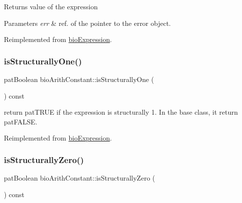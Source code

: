 \begin{DoxyReturn}{Returns}
value of the expression 
\end{DoxyReturn}

\begin{DoxyParams}{Parameters}
{\em err} & ref. of the pointer to the error object. \\
\hline
\end{DoxyParams}


Reimplemented from \hyperlink{classbio_expression_af58662a5d4d456f15bc4f2c9bd4f8a5b}{bio\+Expression}.

\mbox{\label{classbio_arith_constant_a979ab2441d612a23a708fa3c10f3dd6a}} 
\subsubsection{\texorpdfstring{is\+Structurally\+One()}{isStructurallyOne()}}
{\footnotesize\ttfamily pat\+Boolean bio\+Arith\+Constant\+::is\+Structurally\+One (\begin{DoxyParamCaption}{ }\end{DoxyParamCaption}) const\hspace{0.3cm}{\ttfamily [virtual]}}

return pat\+T\+R\+UE if the expression is structurally 1. In the base class, it return pat\+F\+A\+L\+SE. 

Reimplemented from \hyperlink{classbio_expression_a754b37dd7a3e0bb943c23ed8ebd48eaa}{bio\+Expression}.

\mbox{\label{classbio_arith_constant_acd4439b84514d6612a97d422ba8f60c1}} 
\subsubsection{\texorpdfstring{is\+Structurally\+Zero()}{isStructurallyZero()}}
{\footnotesize\ttfamily pat\+Boolean bio\+Arith\+Constant\+::is\+Structurally\+Zero (\begin{DoxyParamCaption}{ }\end{DoxyParamCaption}) const\hspace{0.3cm}{\ttfamily [virtual]}}

